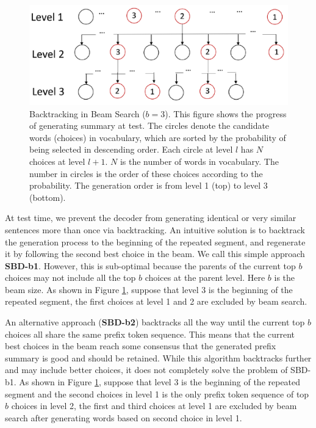 \documentclass{nle}
\theoremstyle{definition}
\newcommand{\figref}[1]{Figure \ref{#1}}
\begin{document}
\begin{figure}[th]
	\centering
	\includegraphics[width=0.8\linewidth]{SBD}
	\caption{Backtracking in Beam Search ($b=3$). 
		This figure shows the progress of generating summary at test. The circles denote the
		candidate words (choices) in vocabulary, 
		which are sorted by the probability of being selected in
		descending order. Each circle at level $l$ has $N$ choices 
		at level $l+1$. $N$ is the number of words in vocabulary. 
		The number in circles is the order of these choices according to the
		probability. The generation order is from level 1 (top) to level 3 (bottom).}
	\label{fig:beam}
\end{figure}

At test time, we prevent the decoder from generating identical or
very similar sentences more than once via backtracking. 
An intuitive solution is to backtrack the generation process to the beginning
of the repeated segment, and regenerate it by following the second best choice
in the beam. We call this simple approach \textbf{SBD-b1}.
However, this is sub-optimal
because the parents of the current top $b$ choices may not include all the top $b$ choices at the
parent level. Here $b$ is the beam size. As shown in \figref{fig:beam}, suppose that level 3 is the
beginning of the repeated segment, the first choices at level 1 and 2 are excluded by beam search. 

An alternative approach (\textbf{SBD-b2}) backtracks all the way until the current
top $b$ choices all share the same prefix token sequence. This means
that the current best choices in the beam reach some consensus that
the generated prefix summary is good and should be retained. 
While this algorithm backtracks further and may
include better choices, it does not completely solve the problem of SBD-b1. 
As shown in \figref{fig:beam}, 
suppose that level 3 is the beginning of the repeated segment and the second choices in
level 1 is the only prefix token sequence of top $b$ choices in level 2, the first and third choices at
level 1 are excluded by beam search after generating words based on second choice in level 1.
\end{document}
